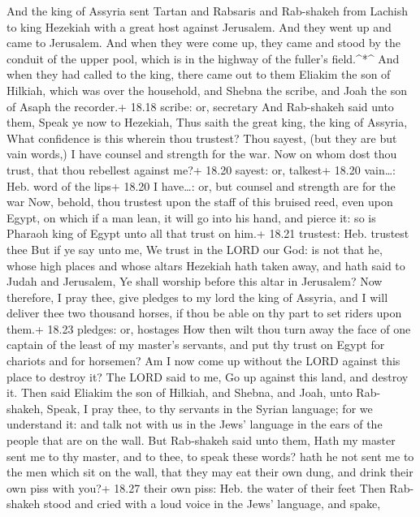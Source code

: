 And the king of Assyria sent Tartan and Rabsaris and
Rab-shakeh from Lachish to king Hezekiah with a great host against
Jerusalem. And they went up and came to Jerusalem. And when they were
come up, they came and stood by the conduit of the upper pool, which is
in the highway of the fuller's field.\^{}*\^{}  And when
they had called to the king, there came out to them Eliakim the son of
Hilkiah, which was over the household, and Shebna the scribe, and Joah
the son of Asaph the recorder.+ 18.18 scribe: or, secretary
 And Rab-shakeh said unto them, Speak ye now to Hezekiah,
Thus saith the great king, the king of Assyria, What confidence is this
wherein thou trustest?  Thou sayest, (but they are but vain
words,) I have counsel and strength for the war. Now on whom dost thou
trust, that thou rebellest against me?+ 18.20 sayest: or, talkest+ 18.20
vain\ldots: Heb. word of the lips+ 18.20 I have\ldots: or, but counsel
and strength are for the war  Now, behold, thou trustest
upon the staff of this bruised reed, even upon Egypt, on which if a man
lean, it will go into his hand, and pierce it: so is Pharaoh king of
Egypt unto all that trust on him.+ 18.21 trustest: Heb. trustest thee
 But if ye say unto me, We trust in the LORD our God: is
not that he, whose high places and whose altars Hezekiah hath taken
away, and hath said to Judah and Jerusalem, Ye shall worship before this
altar in Jerusalem?  Now therefore, I pray thee, give
pledges to my lord the king of Assyria, and I will deliver thee two
thousand horses, if thou be able on thy part to set riders upon them.+
18.23 pledges: or, hostages  How then wilt thou turn away
the face of one captain of the least of my master's servants, and put
thy trust on Egypt for chariots and for horsemen?  Am I now
come up without the LORD against this place to destroy it? The LORD said
to me, Go up against this land, and destroy it.  Then said
Eliakim the son of Hilkiah, and Shebna, and Joah, unto Rab-shakeh,
Speak, I pray thee, to thy servants in the Syrian language; for we
understand it: and talk not with us in the Jews' language in the ears of
the people that are on the wall.  But Rab-shakeh said unto
them, Hath my master sent me to thy master, and to thee, to speak these
words? hath he not sent me to the men which sit on the wall, that they
may eat their own dung, and drink their own piss with you?+ 18.27 their
own piss: Heb. the water of their feet  Then Rab-shakeh
stood and cried with a loud voice in the Jews' language, and spake,
